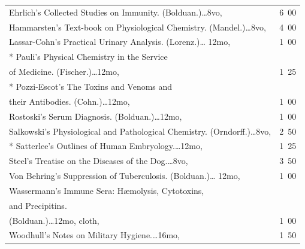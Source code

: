 \documentclass[a4paper,12pt]{book}[2004/02/16]
\theoremstyle{ilemma}
\theoremstyle{itheorem}
\theoremstyle{iother}
\theoremstyle{icorollary}
\theoremstyle{numcorollary}
\theoremstyle{idefinition}
\begin{document}
\begin{longtable}{@{}l@{ }r@{}}
Ehrlich's Collected Studies on Immunity. (Bolduan.)\dotfill\ldots 8vo,
& 6\ 00\\

Hammarsten's Text-book on Physiological
Chemistry. (Mandel.)\dotfill\ldots 8vo, & 4\ 00\\



Lassar-Cohn's Practical Urinary Analysis. (Lorenz.)\dotfill\ldots
12mo, & 1\ 00\\

* Pauli's Physical Chemistry in the Service\\

\nopagebreak

\indent\indent of Medicine. (Fischer.)\dotfill\ldots 12mo, & 1\ 25\\

* Pozzi-Escot's The Toxins and Venoms and\\

\nopagebreak

\indent\indent their Antibodies. (Cohn.)\dotfill\ldots 12mo, & 1\ 00\\

Rostoski's Serum Diagnosis. (Bolduan.)\dotfill\ldots 12mo, & 1\ 00\\

Salkowski's Physiological and Pathological
Chemistry. (Orndorff.)\dotfill\ldots 8vo, & 2\ 50\\

* Satterlee's Outlines of Human Embryology.\dotfill\ldots 12mo, & 1\ 25\\

Steel's Treatise on the Diseases of the Dog.\dotfill\ldots 8vo, & 3\ 50\\

Von Behring's Suppression of Tuberculosis. (Bolduan.)\dotfill\ldots
12mo, & 1\ 00\\

Wassermann's Immune Sera: H\ae{}molysis, Cytotoxins,\\

\nopagebreak

\indent\indent and Precipitins.\\

\indent\indent (Bolduan.)\dotfill\ldots 12mo, cloth, & 1\ 00\\

Woodhull's Notes on Military Hygiene.\dotfill\ldots 16mo, & 1\ 50\\


\end{longtable}
\end{document}
